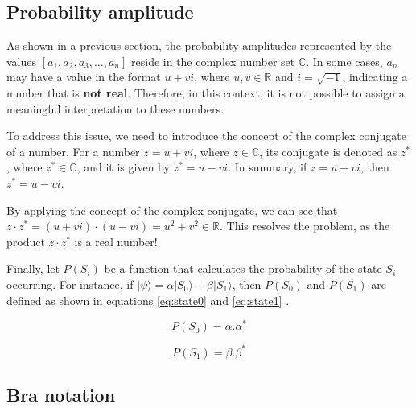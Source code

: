 		\subsection{Probability amplitude}
			\label{sec:probAmpli}
			\par As shown in a previous section, the probability amplitudes represented by the values $[a_1,a_2,a_3, \dots, a_n]$ reside in the complex number set $\mathbb{C}$. In some cases, $a_n$ may have a value in the format $u + vi$, where $u, v \in \mathbb{R}$ and $i = \sqrt{-1}$, indicating a number that is \textbf{not real}. Therefore, in this context, it is not possible to assign a meaningful interpretation to these numbers.\newline
			
			\par To address this issue, we need to introduce the concept of the complex conjugate of a number. For a number $z = u + vi$, where $z \in \mathbb{C}$, its conjugate is denoted as $z^*$, where $z^* \in \mathbb{C}$, and it is given by $z^* = u - vi$. In summary, if $z = u + vi$, then $z^* = u - vi$. \newline
			
			\par By applying the concept of the complex conjugate, we can see that $z \cdot z^* = (u + vi) \cdot (u - vi) = u^2 + v^2 \in \mathbb{R}$. This resolves the problem, as the product $z \cdot z^*$ is a real number!\newline
			
			\par Finally, let \(P(S_i)\) be a function that calculates the probability of the state \(S_i\) occurring. For instance, if \(|\psi\rangle = \alpha |S_0\rangle + \beta |S_1\rangle\), then \(P(S_0)\) and \(P(S_1)\) are defined as shown in equations \ref{eq:state0} and \ref{eq:state1} \cite{binney2013physics}.
			
			\begin{equation}
				\label{eq:state0}
				P(S_0) = \alpha . \alpha^* 
			\end{equation} 
			
			\begin{equation}
				\label{eq:state1}
				P(S_1) = \beta . \beta^* 
			\end{equation}

		\subsection{Bra notation}
			\label{sec:braNotation}
			
